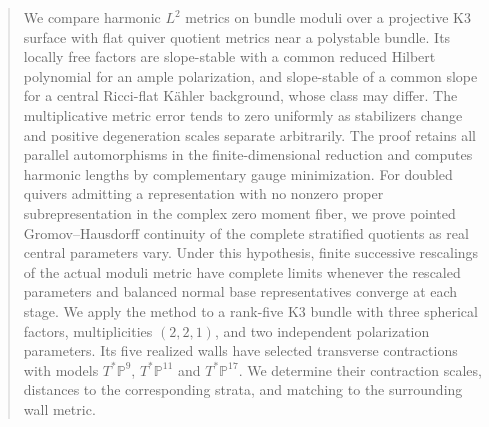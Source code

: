 

\begin{abstract}
We compare harmonic $L^2$ metrics on bundle moduli over a projective
K3 surface with flat quiver quotient metrics near a polystable bundle.
Its locally free factors are slope-stable with a common reduced Hilbert
polynomial for an ample polarization, and slope-stable of a common slope
for a central Ricci-flat K\"ahler background, whose class may differ.
The multiplicative metric error tends to zero uniformly as stabilizers
change and positive degeneration scales separate arbitrarily.
The proof retains all parallel automorphisms in the finite-dimensional
reduction and computes harmonic lengths by complementary gauge minimization.
For doubled quivers admitting a representation with no nonzero proper
subrepresentation in the complex zero moment fiber, we prove pointed
Gromov--Hausdorff continuity of the complete stratified quotients as real
central parameters vary. Under this hypothesis, finite successive
rescalings of the actual moduli metric have complete limits whenever
the rescaled parameters and balanced normal base representatives converge
at each stage. We apply the method to a rank-five K3 bundle with three
spherical factors, multiplicities $(2,2,1)$, and two independent
polarization parameters. Its five realized walls have selected transverse
contractions with models $T^*\mathbb P^9$, $T^*\mathbb P^{11}$ and
$T^*\mathbb P^{17}$. We determine their contraction scales, distances to
the corresponding strata, and matching to the surrounding wall metric.
\end{abstract}
\maketitle
\enlargethispage{2pt}











